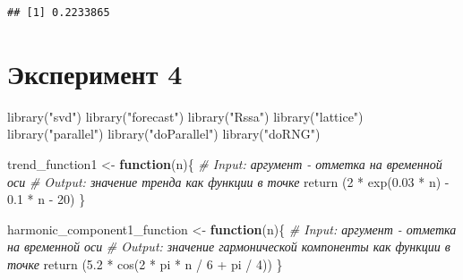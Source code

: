 \documentclass[specialist,
               substylefile = spbu_report.rtx,
               subf,href,colorlinks=true, 12pt]{disser}
\theoremstyle{definition}
\newenvironment{Shaded}{\begin{snugshade}}{\end{snugshade}}
\newcommand{\CommentTok}[1]{\textcolor[rgb]{0.56,0.35,0.01}{\textit{#1}}}
\newcommand{\ControlFlowTok}[1]{\textcolor[rgb]{0.13,0.29,0.53}{\textbf{#1}}}
\newcommand{\DecValTok}[1]{\textcolor[rgb]{0.00,0.00,0.81}{#1}}
\newcommand{\FloatTok}[1]{\textcolor[rgb]{0.00,0.00,0.81}{#1}}
\newcommand{\FunctionTok}[1]{\textcolor[rgb]{0.00,0.00,0.00}{#1}}
\newcommand{\NormalTok}[1]{#1}
\newcommand{\OtherTok}[1]{\textcolor[rgb]{0.56,0.35,0.01}{#1}}
\newcommand{\SpecialCharTok}[1]{\textcolor[rgb]{0.00,0.00,0.00}{#1}}
\newcommand{\StringTok}[1]{\textcolor[rgb]{0.31,0.60,0.02}{#1}}
\begin{document}
\begin{verbatim}
## [1] 0.2233865
\end{verbatim}

\section{Эксперимент 4}

\begin{Shaded}
\begin{Highlighting}[]
  \FunctionTok{library}\NormalTok{(}\StringTok{"svd"}\NormalTok{)}
  \FunctionTok{library}\NormalTok{(}\StringTok{"forecast"}\NormalTok{)}
  \FunctionTok{library}\NormalTok{(}\StringTok{"Rssa"}\NormalTok{)}
  \FunctionTok{library}\NormalTok{(}\StringTok{"lattice"}\NormalTok{)}
  \FunctionTok{library}\NormalTok{(}\StringTok{"parallel"}\NormalTok{)}
  \FunctionTok{library}\NormalTok{(}\StringTok{"doParallel"}\NormalTok{)}
  \FunctionTok{library}\NormalTok{(}\StringTok{"doRNG"}\NormalTok{)}
\end{Highlighting}
\end{Shaded}

\begin{Shaded}
\begin{Highlighting}[]
\NormalTok{    trend\_function1 }\OtherTok{\textless{}{-}} \ControlFlowTok{function}\NormalTok{(n)\{}
      \CommentTok{\# Input: аргумент {-} отметка на временной оси}
      \CommentTok{\# Output: значение тренда как функции в точке}
      \FunctionTok{return}\NormalTok{ (}\DecValTok{2} \SpecialCharTok{*} \FunctionTok{exp}\NormalTok{(}\FloatTok{0.03} \SpecialCharTok{*}\NormalTok{ n) }\SpecialCharTok{{-}} \FloatTok{0.1} \SpecialCharTok{*}\NormalTok{ n }\SpecialCharTok{{-}} \DecValTok{20}\NormalTok{)}
\NormalTok{    \}}
\end{Highlighting}
\end{Shaded}

\begin{Shaded}
\begin{Highlighting}[]
\NormalTok{    harmonic\_component1\_function }\OtherTok{\textless{}{-}} \ControlFlowTok{function}\NormalTok{(n)\{}
      \CommentTok{\# Input: аргумент {-} отметка на временной оси}
      \CommentTok{\# Output: значение гармонической компоненты как функции в точке}
      \FunctionTok{return}\NormalTok{ (}\FloatTok{5.2} \SpecialCharTok{*} \FunctionTok{cos}\NormalTok{(}\DecValTok{2} \SpecialCharTok{*}\NormalTok{ pi }\SpecialCharTok{*}\NormalTok{ n }\SpecialCharTok{/} \DecValTok{6} \SpecialCharTok{+}\NormalTok{ pi }\SpecialCharTok{/} \DecValTok{4}\NormalTok{))}
\NormalTok{    \}}
\end{Highlighting}
\end{Shaded}
\end{document}
